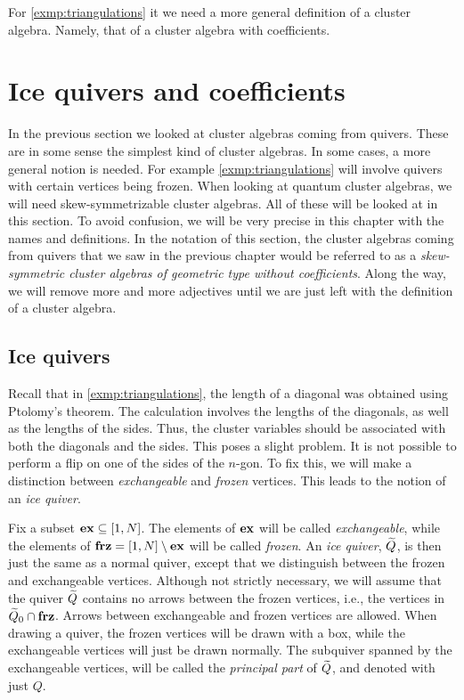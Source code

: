 For \cref{exmp:triangulations} it we need a more general
definition of a cluster algebra. Namely, that of a cluster algebra with coefficients.

\section{Ice quivers and coefficients}\label{sec:ice_quivers_and_coefficients}

In the previous section we looked at cluster algebras coming from quivers. These are in
some sense the simplest kind of cluster algebras. In some cases, a more general notion
is needed. For example \cref{exmp:triangulations} will involve quivers with certain
vertices being frozen. When looking at quantum cluster algebras, we will need
skew-symmetrizable cluster algebras. All of these will be looked at in this section. To
avoid confusion, we will be very precise in this chapter with the names and
definitions. In the notation of this section, the cluster algebras coming from quivers
that we saw in the previous chapter would be referred to as a \emph{skew-symmetric
	cluster algebras of geometric type without coefficients}. Along the way, we will remove
more and more adjectives until we are just left with the definition of a cluster
algebra.

\subsection{Ice quivers}

Recall that in \cref{exmp:triangulations}, the length of a diagonal was obtained using
Ptolomy's theorem. The calculation involves the lengths of the diagonals, as
well as the lengths of the sides. Thus, the cluster variables should be
associated with both the diagonals and the sides. This poses a slight problem.
It is not possible to perform a flip on one of the sides of the $n$-gon. To fix this,
we will make a distinction between \emph{exchangeable} and \emph{frozen} vertices. This
leads to the notion of an \emph{ice quiver}.

Fix a subset $\mathbf{ex} \subseteq [1, N]$. The elements of $\mathbf{ex}$ will be called
\emph{exchangeable}, while the elements of $\mathbf{frz} = [1, N] \setminus
	\mathbf{ex}$ will be called \emph{frozen}. An \emph{ice quiver}, $\widetilde{Q}$, is then
just the same as a normal quiver, except that we distinguish between the frozen and
exchangeable vertices. Although not strictly necessary, we will assume that the quiver
$\widetilde{Q}$ contains no arrows between the frozen vertices, i.e., the vertices in $\widetilde{Q}_0 \cap
	\mathbf{frz}$. Arrows between exchangeable and frozen vertices are allowed. When drawing a
quiver, the frozen vertices will be drawn with a box, while the exchangeable vertices
will just be drawn normally. The subquiver spanned by the exchangeable vertices, will
be called the \emph{principal part} of $\widetilde{Q}$, and
denoted with just $Q$.

